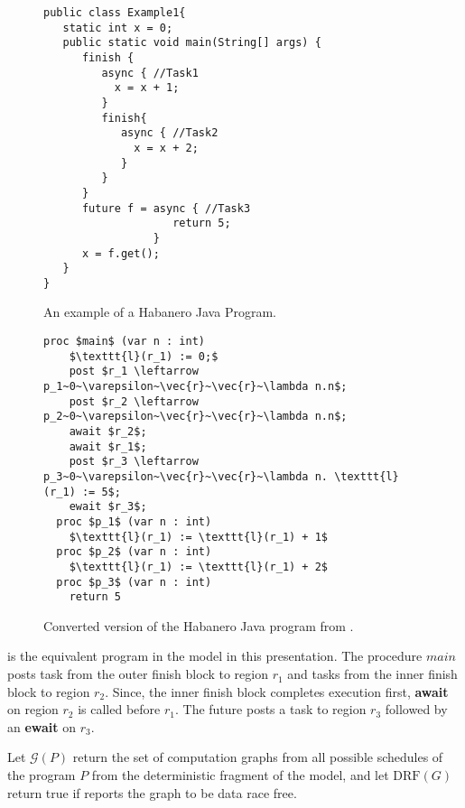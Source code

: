 \begin{figure}
  \begin{center}
\begin{lstlisting}
public class Example1{
   static int x = 0;
   public static void main(String[] args) {
      finish {
         async { //Task1
           x = x + 1;
         }
         finish{
            async { //Task2
              x = x + 2;
            }
         }
      }
      future f = async { //Task3
                    return 5;
                 }
      x = f.get();
   }
}
\end{lstlisting}
  \end{center}
  \caption{An example of a Habanero Java Program.}
  \label{fig:hj-async-fin}
\end{figure}

\begin{figure}
  \begin{center}
\begin{lstlisting}[mathescape=true]
  proc $main$ (var n : int)
  	$\texttt{l}(r_1) := 0;$
	post $r_1 \leftarrow p_1~0~\varepsilon~\vec{r}~\vec{r}~\lambda n.n$;
	post $r_2 \leftarrow p_2~0~\varepsilon~\vec{r}~\vec{r}~\lambda n.n$;
	await $r_2$;
	await $r_1$;
	post $r_3 \leftarrow p_3~0~\varepsilon~\vec{r}~\vec{r}~\lambda n. \texttt{l}(r_1) := 5$;
	ewait $r_3$;	
  proc $p_1$ (var n : int)
  	$\texttt{l}(r_1) := \texttt{l}(r_1) + 1$
  proc $p_2$ (var n : int)
  	$\texttt{l}(r_1) := \texttt{l}(r_1) + 2$
  proc $p_3$ (var n : int)
  	return 5
\end{lstlisting}
  \end{center}
  \caption{Converted version of the Habanero Java program from .}
  \label{fig:hj-async-fin-converted}
\end{figure}

 is the equivalent program in the model in this presentation. The procedure $main$ posts task from the outer finish block to region $r_1$ and tasks from the inner finish block to region $r_2$. Since, the inner finish block completes execution first, \textbf{await} on region $r_2$ is called before $r_1$. The future posts a task to region $r_3$ followed by an \textbf{ewait} on $r_3$.

Let $\mathcal{G}( P )$ return the set of computation graphs from all possible schedules of the program $P$ from the deterministic fragment of the model, and let $\mathrm{DRF}( G )$ return true if  reports the graph to be data race free. 

